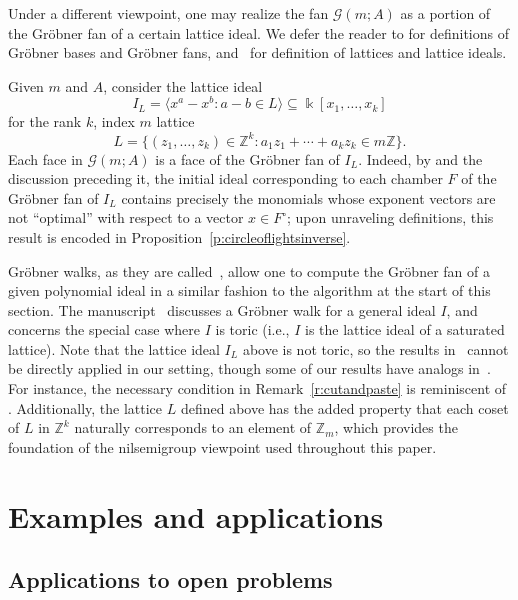 \documentclass[ALCO, Unicode]{cedram}
\newcommand\ZZ{\mathbb{Z}}
\newcommand\kk{\Bbbk}
\begin{document}
\begin{remas}\label{r:groebnerfans}
Under a different viewpoint, one may realize the fan $\mathcal G(m;A)$ as a portion of the Gr\"obner fan of a certain lattice ideal.  We defer the reader to \cite{grobpoly} for definitions of Gr\"obner bases and Gr\"obner fans, and~\cite{cca} for definition of lattices and lattice ideals.  

Given $m$ and $A$, consider the lattice ideal 
$$I_L = \langle x^a - x^b : a - b \in L \rangle \subseteq \kk[x_1, \ldots, x_k]$$
for the rank $k$, index $m$ lattice
$$L = \{(z_1, \ldots, z_k) \in \ZZ^k : a_1z_1 + \cdots + a_kz_k \in m\ZZ\}.$$
Each face in $\mathcal G(m;A)$ is a face of the Gr\"obner fan of $I_L$.  Indeed, by \cite[Corollary~7.29]{cca} and the discussion preceding it, the initial ideal corresponding to each chamber $F$ of the Gr\"obner fan of $I_L$ contains precisely the monomials whose exponent vectors are not ``optimal'' with respect to a vector $x \in F^\circ$; upon unraveling definitions, this result is encoded in Proposition~\ref{p:circleoflightsinverse}.  

Gr\"obner walks, as they are called~\cite{gfanpaper}, allow one to compute the Gr\"obner fan of a given polynomial ideal in a similar fashion to the algorithm at the start of this section.  The manuscript~\cite{genericgroebnerwalk} discusses a Gr\"obner walk for a general ideal $I$, and~\cite{toricgroebnerwalk} concerns the special case where $I$ is toric (i.e., $I$ is the lattice ideal of a saturated lattice).  Note that the lattice ideal $I_L$ above is not toric, so the results in~\cite{toricgroebnerwalk} cannot be directly applied in our setting, though some of our results have analogs in~\cite{toricgroebnerwalk}.  For instance, the necessary condition in Remark~\ref{r:cutandpaste} is reminiscent of \cite[Theorem~3.6]{toricgroebnerwalk}.  Additionally, the lattice $L$ defined above has the added property that each coset of $L$ in $\ZZ^k$ naturally corresponds to an element of $\ZZ_m$, which provides the foundation of the nilsemigroup viewpoint used throughout this paper.  
\end{remas}

\section{Examples and applications}
\label{sec:applications}


\subsection{Applications to open problems}
\label{subsec:applications}
\end{document}
